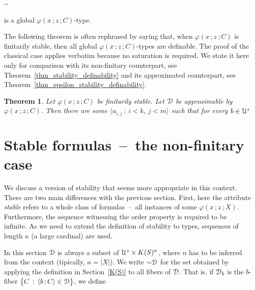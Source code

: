 \documentclass{amsproc}
\newcounter{thm}
\theoremstyle{mio}
\newtheorem{theorem}[thm]{Theorem}\tcolorboxenvironment{theorem}{mythm}
\begin{document}
  \noindent\kern-\kern-

is a global $\varphi(x\,;z\,;C)$-type.\smallskip

The following theorem is often rephrased by saying that, when $\varphi(x\,;z\,;C)$ is finitarily stable, then all global $\varphi(x\,;z\,;C)$-types are definable.
The proof of the classical case applies verbatim because no saturation is required.
We state it here only for comparison with its non-finitary counterpart, see Theorem~\ref{thm_stability_definability} and its approximated counterpart, see Theorem~\ref{thm_epsilon_stability_definability}.

\begin{theorem}
  Let $\varphi(x\,;z\,;C)$ be finitarily stable.
  Let ${\EuScript D}$ be approximable by $\varphi(x\,;z\,;C)$.
  Then there are some $\langle a_{i,j}\ :\ i< k,\ j<m\rangle$ such that for every $b\in{\EuScript U}^z$\medskip

\end{theorem}


\section{Stable formulas~--~the non-finitary case}
\def\medrel#1{\parbox{5ex}{\hfil $#1$}}
\def\ceq#1#2#3{\parbox[t]{22ex}{$\displaystyle #1$}\medrel{#2}{$\displaystyle #3$}}

We discuss a version of stability that seems more appropriate in this context.
There are two main differences with the previous section.
First, here the attribute \textit{stable\/} refers to a whole class of formulas~--~all instances of some $\varphi(x\,;z\,;X)$.
Furthermore, the sequence witnessing the order property is required to be infinite.
As we need to extend the definition of stability to types, sequences of length $\kappa$ (a large cardinal) are used.

In this section  ${\EuScript D}$ is always a subset of ${\EuScript U}^z\times K(S)^n$, where $n$ has to be inferred from the context (tipically, $n=|X|$).
We write ${\sim}{\EuScript D}$ for the set obtained by applying the definition in Section~\ref{K(S)} to all fibers of ${\EuScript D}$.
That is, if ${\EuScript D}_b$ is the $b$-fiber $\big\{C\,:\,\langle b\,;C\rangle\in{\EuScript D}\big\}$, we define
\end{document}
